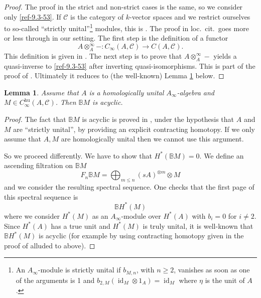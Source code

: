 \documentclass{amsart}
\numberwithin{equation}{section}
\let\cal\mathcal
\newtheorem{lemmas}{Lemma}[subsection]
\theoremstyle{definition}
\theoremstyle{remark}
\begin{document}
\begin{proof} The proof in the strict and non-strict cases is the same, so we consider only
\eqref{ref-9.3-53}.
If ${{\cal C}}$ is the category of $k$-vector spaces
and we restrict ourselves to so-called  ``strictly unital''\footnote{An $A_\infty$-module is strictly unital if $b_{M,n}$, with $n\geq 2$,
vanishes as soon as one of the arguments is 1 and $b_{2,M}({{\operatorname {id}}}_M\otimes 1_A)={{\operatorname {id}}}_M$ where $\eta$ is the unit of $A$.} modules, this is 
\cite[Lemme 4.1.3.8]{Lefevre}. The proof in loc.\ cit.\ goes more or
less through in our setting.  The first step is the definition of
a functor
\[
A\otimes^{\infty}_A -: C_\infty(A,{{\cal C}}){\rightarrow} C(A,{{\cal C}}).
\]
This definition is given in \cite[Lemme 4.1.1.6]{Lefevre}.  The next step is to prove that
$A\otimes^{\infty}_A -$ yields  a quasi-inverse to \eqref{ref-9.3-53} after inverting quasi-isomorphisms. This is part
of the proof of \cite[Lemme 4.1.1.6]{Lefevre}. Ultimately it reduces to (the well-known) Lemma
\ref{ref-9.2.2-54} below.
\end{proof}
\begin{lemmas} 
\label{ref-9.2.2-54}
Assume that $A$ is a homologically unital $A_\infty$-algebra
and $M\in C_\infty^{\operatorname{hu}}(A,{{\cal C}})$. Then ${\mathbb{B}} M$ is acyclic.
\end{lemmas}
\begin{proof} 
The fact that ${\mathbb{B}} M$ is acyclic is proved in \cite[Lemme 4.1.1.6]{Lefevre}, under
the hypothesis that $A$ and $M$ are ``strictly unital'', by providing an explicit
contracting homotopy. If we only assume that $A,M$ are homologically
unital then we cannot use this argument.

So we proceed differently. We have to show that 
$
H^\ast({\mathbb{B}} M)=0
$. 
We define an ascending filtration on ${\mathbb{B}} M$
\[
F_n {\mathbb{B}} M=\bigoplus_{m\le n} (sA)^{\otimes m} \otimes M
\]
and we consider the resulting spectral sequence.
One 
checks that the first page of this spectral sequence is
\[
{\mathbb{B}} H^\ast(M)
\]
where we consider $H^\ast(M)$ as an $A_\infty$-module over $H^\ast(A)$ with $b_i=0$ for $i\ne 2$.
Since $H^\ast(A)$ has a true unit and $H^\ast(M)$ is truly unital, it is well-known that
${\mathbb{B}} H^\ast(M)$ is acyclic (for example by using
contracting homotopy given in the proof of  \cite[Lemme 4.1.1.6]{Lefevre}  alluded to above).
\end{proof}
\end{document}
